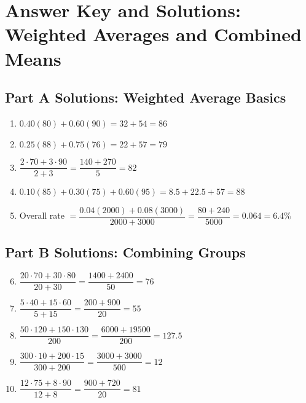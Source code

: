 \documentclass[14pt]{extarticle}
\begin{document}
\newpage


\section*{Answer Key and Solutions: Weighted Averages and Combined Means}

\subsection*{Part A Solutions: Weighted Average Basics}
\begin{enumerate}
  \item \(0.40(80)+0.60(90)=32+54=\boxed{86}\)
  \item \(0.25(88)+0.75(76)=22+57=\boxed{79}\)
  \item \(\dfrac{2\cdot70+3\cdot90}{2+3}=\dfrac{140+270}{5}=\boxed{82}\)
  \item \(0.10(85)+0.30(75)+0.60(95)=8.5+22.5+57=\boxed{88}\)
  \item Overall rate \(=\dfrac{0.04(2000)+0.08(3000)}{2000+3000}=\dfrac{80+240}{5000}=0.064=\boxed{6.4\%}\)
\end{enumerate}

\subsection*{Part B Solutions: Combining Groups}
\begin{enumerate}
  \setcounter{enumi}{5}
  \item \(\dfrac{20\cdot70+30\cdot80}{20+30}=\dfrac{1400+2400}{50}=\boxed{76}\)
  \item \(\dfrac{5\cdot40+15\cdot60}{5+15}=\dfrac{200+900}{20}=\boxed{55}\)
  \item \(\dfrac{50\cdot120+150\cdot130}{200}=\dfrac{6000+19500}{200}=\boxed{127.5}\)
  \item \(\dfrac{300\cdot10+200\cdot15}{300+200}=\dfrac{3000+3000}{500}=\boxed{12}\)
  \item \(\dfrac{12\cdot75+8\cdot90}{12+8}=\dfrac{900+720}{20}=\boxed{81}\)
\end{enumerate}
\end{document}
